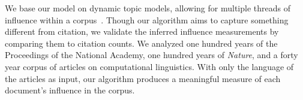 
We base our model on dynamic topic models, allowing for multiple
threads of influence within a corpus~\cite{blei:2006}. Though our
algorithm aims to capture something different from citation, we
validate the inferred influence measurements by comparing them to
citation counts.  We analyzed one hundred years of the Proceedings of
the National Academy, one hundred years of \textit{Nature}, and a
forty year corpus of articles on computational linguistics.  With only
the language of the articles as input, our algorithm produces a
meaningful measure of each document's influence in the corpus.


